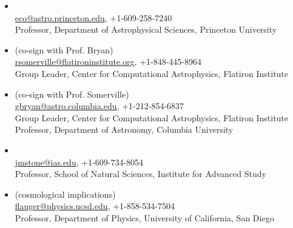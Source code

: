 \documentclass[12pt,preprint,letter]{aastex63}
\begin{document}
\begin{itemize}%

\item \subtitle{Eve C. Ostriker} \\
\url{eco@astro.princeton.edu}, +1-609-258-7240\\
Professor, Department of Astrophysical Sciences, Princeton University

\item \subtitle{Rachel S. Somerville} (co-sign with Prof. Bryan) \\
\url{rsomerville@flatironinstitute.org}, +1-848-445-8964\\
Group Leader, Center for Computational Astrophysics, Flatiron Institute

\item \subtitle{Greg L. Bryan} (co-sign with Prof. Somerville) \\
\url{gbryan@astro.columbia.edu}, +1-212-854-6837\\
Group Leader, Center for Computational Astrophysics, Flatiron Institute\\
Professor, Department of Astronomy, Columbia University

\item \subtitle{James M. Stone} \\
\url{jmstone@ias.edu}, +1-609-734-8054\\
Professor, School of Natural Sciences, Institute for Advanced Study 


\item \subtitle{Raphael Flauger} (cosmological implications)\\
\url{flauger@physics.ucsd.edu}, +1-858-534-7504\\
Professor, Department of Physics, University of California, San Diego


\end{itemize}
\end{document}
